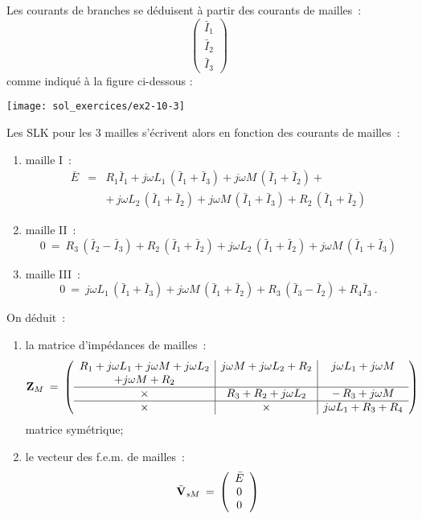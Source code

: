 Les courants de branches se déduisent à partir des courants de mailles~:
\[ \left( \begin{array}{c} \bar{I}_1 \\ \bar{I}_2 \\ \bar{I}_3 \end{array} \right) \]
comme indiqué à la figure ci-dessous : 
\begin{center}
	\texttt{[image: sol\_exercices/ex2-10-3]}
\end{center}
Les SLK pour les 3 mailles s'écrivent alors en fonction des courants de mailles~:
\begin{enumerate}
	\item maille I~:
	\begin{eqnarray*}
		\bar{E} &=& R_1 \bar{I}_1 + j\omega L_1 \, (\bar{I}_1 + \bar{I}_3) + j\omega M\, 
		(\bar{I}_1 + \bar{I}_2) +\\
		&& + \, j\omega L_2 \, (\bar{I}_1 + \bar{I}_2) + j\omega M\, (\bar{I}_1 + \bar{I}_3) + 
		R_2 \, (\bar{I}_1 + \bar{I}_2) 
	\end{eqnarray*}
	\item maille II~:
	\[ 0 \: = \: R_3\, (\bar{I}_2 - \bar{I}_3) + R_2\, (\bar{I}_1 + \bar{I}_2) + j\omega L_2 \, 
	(\bar{I}_1 + \bar{I}_2) + j\omega M \, (\bar{I}_1 + \bar{I}_3) \]
	\item maille III~:
	\[ 0 \: = \: j\omega L_1 \, (\bar{I}_1 + \bar{I}_3) + j\omega M\, 
	(\bar{I}_1 + \bar{I}_2) + R_3 \,  (\bar{I}_3 - \bar{I}_2) 
	+ R_4 \bar{I}_3~.\]
\end{enumerate}
On déduit~:
\begin{enumerate}
	\item la matrice d'impédances de mailles~:
	\[{\bf Z}_M \: = \: 
	\left( \begin{array}{c|c|c}
	R_1 + j\omega L_1 + j\omega M + j\omega L_2 & j\omega M + j\omega L_2 + R_2 & j\omega L_1 + j\omega M \\
	+ j\omega M + R_2 &&\\\hline
	\times & R_3 + R_2 + j\omega L_2 & -\, R_3 + j\omega M\\\hline
	\times &  \times & j\omega L_1 + R_3 + R_4
	\end{array} \right) \]
	matrice symétrique;
	
	\item le vecteur des f.e.m. de mailles~:
	\[ \bar{\bf V}_{sM} \: = \, \left( 
	\begin{array}{c} \bar{E} \\ 0 \\ 0 \end{array} \right) \]
\end{enumerate}
